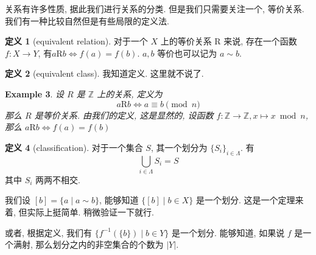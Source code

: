 \documentclass[10pt]{ctexart}
\theoremstyle{definition}
\theoremstyle{definition}
\newtheorem{definition}{定义}[section]
\theoremstyle{plain}
\newtheorem{exam}[definition]{Example}
\theoremstyle{remark}
\begin{document}
关系有许多性质, 据此我们进行关系的分类. 但是我们只需要关注一个, 等价关系. 我们有一种比较自然但是有些局限的定义法.

\begin{definition}[equivalent relation]
对于一个 \(X\) 上的等价关系 \(\mathrm R\) 来说, 存在一个函数 \(f \colon X \to Y\), 有\(a \mathrm R b \iff f (a) = f (b)\).  \(a ,b \) 等价也可以记为 \(a \sim b\).
\end{definition}
\begin{definition}[equivalent class]
我知道定义. 这里就不说了. 
\end{definition}
\begin{exam}
设 \(R\) 是 \(\mathbb Z\) 上的关系, 定义为
\begin{equation}
	a\mathrm R b \iff  a \equiv b \pmod{n} 
\end{equation}
那么 \(R\) 是等价关系. 由我们的定义, 这是显然的, 设函数 \(f \colon \mathbb Z \to \mathbb Z, x \mapsto x  \bmod {n}\), 那么 \(a \mathrm R b \iff f (a) = f(b)\)
\end{exam}

\begin{definition}[classification]
对于一个集合 \(S\), 其一个划分为 \(\{ S_{i}  \}_{i \in \Lambda}\). 
有 
\begin{equation}
\bigcup_{i \in \Lambda} S_{i} = S 
\end{equation}
其中 \(S_{i}\) 两两不相交.
\end{definition}

我们设 \([b] = \{ a \mid a \sim b \}\), 能够知道 \(\{ [b] \mid b \in X\}\) 是一个划分. 这是一个定理来着, 但实际上挺简单. 稍微验证一下就行. 

或者, 根据定义, 我们有 \(\{ f ^{-1} ( \{b \} ) \mid b \in Y \}\) 是一个划分. 能够知道, 如果说 \(f\) 是一个满射, 那么划分之内的非空集合的个数为 \(|Y|\). 
\end{document}
